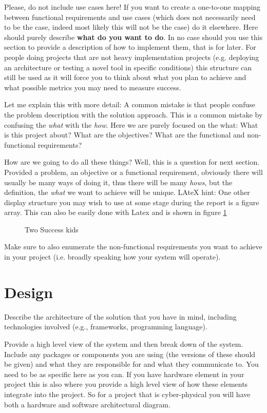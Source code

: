 Please, do not include use cases here! If you want to create a one-to-one mapping between functional requirements and use cases (which does not necessarily need to be the case, indeed most likely this will not be the case) do it elsewhere. Here should purely describe \textbf{what do you want to do}. In no case should you use this section to provide a description of how to implement them, that is for later. For people doing projects that are not heavy implementation projects (e.g. deploying an architecture or testing a novel tool in specific conditions) this structure can still be used as it will force you to think about what you plan to achieve and what possible metrics you may need to measure success.

Let me explain this with more detail: A common mistake is that people confuse the problem description with the solution approach. This is a common mistake by confusing the \emph{what} with the \emph{how}. Here we are purely focused on the what: What is this project about? What are the objectives? What are the functional and non-functional requirements? 

How are we going to do all these things? Well, this is a question for next section. Provided a problem, an objective or a functional requirement, obviously there will usually be many ways of doing it, thus there will be many \emph{hows}, but the definition, the \emph{what} we want to achieve will be unique. LAteX hint: One other display structure you may wish to use at some stage during the report is a figure array. This can also be easily done with Latex and is shown in figure \ref{fig:twosuccesskid}

\begin{figure}
\centering     %
{}
\caption{Two Success kids}
\label{fig:twosuccesskid}
\end{figure}

Make sure to also enumerate the non-functional requirements you want to achieve in your project (i.e. broadly speaking how your system will operate).

\section{Design} \label{sec:Arch}
Describe the architecture of the solution that you have in mind, including technologies involved (e.g., frameworks, programming language). 

Provide a high level view of the system and then break down of the system. Include any packages or components you are using (the versions of these should be given) and what they are responsible for and what they communicate to. You need to be as specific here as you can. If you have hardware element in your project this is also where you provide a high level view of how these elements integrate into the project. So for a project that is cyber-physical you will have both a hardware and software architectural diagram.
